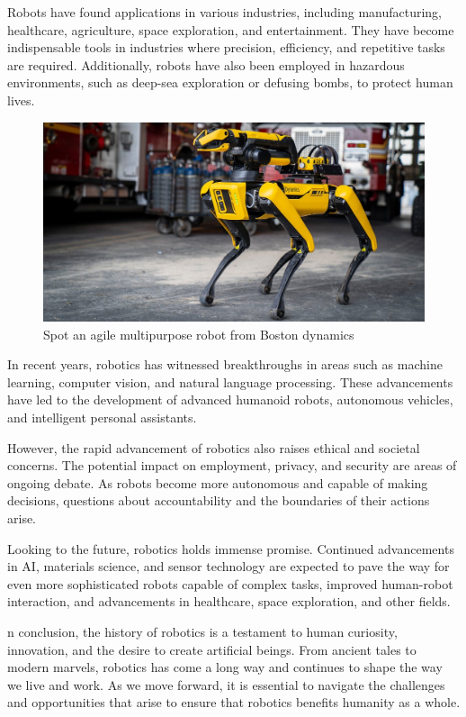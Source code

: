Robots have found applications in various industries, including manufacturing, healthcare, agriculture, space exploration, and entertainment. They have become indispensable tools in industries where precision, efficiency, and repetitive tasks are required. Additionally, robots have also been employed in hazardous environments, such as deep-sea exploration or defusing bombs, to protect human lives.
\begin{figure}[H]
    \centering
    \includegraphics[scale=.5]{images/boston-dynamics-spot}
    \caption[Boston dynamics robot (spot)]{Spot an agile multipurpose robot from Boston dynamics \protect\footnotemark}
\end{figure}

In recent years, robotics has witnessed breakthroughs in areas such as machine learning, computer vision, and natural language processing. These advancements have led to the development of advanced humanoid robots, autonomous vehicles, and intelligent personal assistants.


However, the rapid advancement of robotics also raises ethical and societal concerns. The potential impact on employment, privacy, and security are areas of ongoing debate. As robots become more autonomous and capable of making decisions, questions about accountability and the boundaries of their actions arise.

Looking to the future, robotics holds immense promise. Continued advancements in AI, materials science, and sensor technology are expected to pave the way for even more sophisticated robots capable of complex tasks, improved human-robot interaction, and advancements in healthcare, space exploration, and other fields.

n conclusion, the history of robotics is a testament to human curiosity, innovation, and the desire to create artificial beings. From ancient tales to modern marvels, robotics has come a long way and continues to shape the way we live and work. As we move forward, it is essential to navigate the challenges and opportunities that arise to ensure that robotics benefits humanity as a whole.

